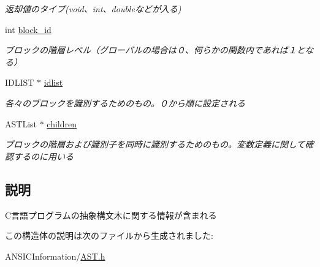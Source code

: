 \begin{DoxyCompactItemize}
\begin{DoxyCompactList}\small\item\em 返却値のタイプ(void、int、doubleなどが入る) \item\end{DoxyCompactList}\item 
\hypertarget{structabstract__syntax__tree_a1130545fa7b86f9006c3b68b0943a33a}{
int \hyperlink{structabstract__syntax__tree_a1130545fa7b86f9006c3b68b0943a33a}{block\_\-id}}
\label{structabstract__syntax__tree_a1130545fa7b86f9006c3b68b0943a33a}

\begin{DoxyCompactList}\small\item\em ブロックの階層レベル（グローバルの場合は０、何らかの関数内であれば１となる） \item\end{DoxyCompactList}\item 
\hypertarget{structabstract__syntax__tree_a9207cfa97354e44aae39c4686a924357}{
IDLIST $\ast$ \hyperlink{structabstract__syntax__tree_a9207cfa97354e44aae39c4686a924357}{idlist}}
\label{structabstract__syntax__tree_a9207cfa97354e44aae39c4686a924357}

\begin{DoxyCompactList}\small\item\em 各々のブロックを識別するためのもの。０から順に設定される \item\end{DoxyCompactList}\item 
\hypertarget{structabstract__syntax__tree_ab5e78b5322a2bab5b0aa21d40522a78b}{
ASTList $\ast$ \hyperlink{structabstract__syntax__tree_ab5e78b5322a2bab5b0aa21d40522a78b}{children}}
\label{structabstract__syntax__tree_ab5e78b5322a2bab5b0aa21d40522a78b}

\begin{DoxyCompactList}\small\item\em ブロックの階層および識別子を同時に識別するためのもの。変数定義に関して確認するのに用いる \item\end{DoxyCompactList}\end{DoxyCompactItemize}


\subsection{説明}
C言語プログラムの抽象構文木に関する情報が含まれる 

この構造体の説明は次のファイルから生成されました:\begin{DoxyCompactItemize}
\item 
ANSICInformation/\hyperlink{AST_8h}{AST.h}\end{DoxyCompactItemize}
